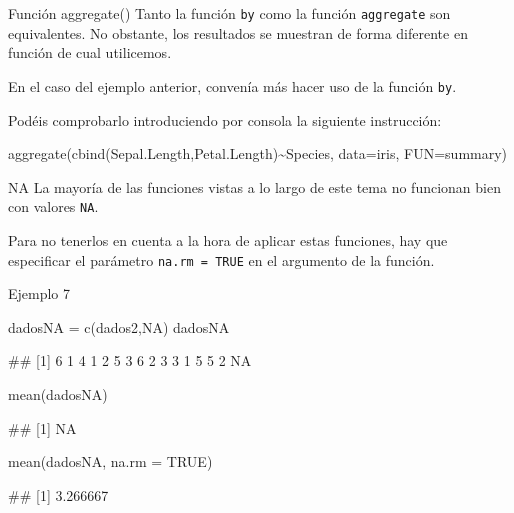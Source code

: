 \documentclass[
  ignorenonframetext,
  aspectratio=169]{beamer}
\newenvironment{Shaded}{\begin{snugshade}}{\end{snugshade}}
\newcommand{\AttributeTok}[1]{\textcolor[rgb]{0.77,0.63,0.00}{#1}}
\newcommand{\ConstantTok}[1]{\textcolor[rgb]{0.00,0.00,0.00}{#1}}
\newcommand{\FunctionTok}[1]{\textcolor[rgb]{0.00,0.00,0.00}{#1}}
\newcommand{\NormalTok}[1]{#1}
\newcommand{\OtherTok}[1]{\textcolor[rgb]{0.56,0.35,0.01}{#1}}
\newcommand{\SpecialCharTok}[1]{\textcolor[rgb]{0.00,0.00,0.00}{#1}}
\let\oldverbatim\verbatim
\let\endoldverbatim\endverbatim
\renewenvironment{verbatim}{\tiny\oldverbatim}{\endoldverbatim}
\begin{document}
\begin{frame}[fragile]{Función aggregate()}
\protect\hypertarget{funciuxf3n-aggregate}{}
Tanto la función \texttt{by} como la función \texttt{aggregate} son
equivalentes. No obstante, los resultados se muestran de forma diferente
en función de cual utilicemos.

En el caso del ejemplo anterior, convenía más hacer uso de la función
\texttt{by}.

Podéis comprobarlo introduciendo por consola la siguiente instrucción:

\begin{Shaded}
\begin{Highlighting}[]
\FunctionTok{aggregate}\NormalTok{(}\FunctionTok{cbind}\NormalTok{(Sepal.Length,Petal.Length)}\SpecialCharTok{\textasciitilde{}}\NormalTok{Species, }\AttributeTok{data=}\NormalTok{iris, }\AttributeTok{FUN=}\NormalTok{summary)}
\end{Highlighting}
\end{Shaded}
\end{frame}

\begin{frame}[fragile]{NA}
\protect\hypertarget{na}{}
La mayoría de las funciones vistas a lo largo de este tema no funcionan
bien con valores \texttt{NA}.

Para no tenerlos en cuenta a la hora de aplicar estas funciones, hay que
especificar el parámetro \texttt{na.rm\ =\ TRUE} en el argumento de la
función.
\end{frame}

\begin{frame}[fragile]{Ejemplo 7}
\protect\hypertarget{ejemplo-7}{}
\begin{Shaded}
\begin{Highlighting}[]
\NormalTok{dadosNA }\OtherTok{=} \FunctionTok{c}\NormalTok{(dados2,}\ConstantTok{NA}\NormalTok{)}
\NormalTok{dadosNA}
\end{Highlighting}
\end{Shaded}

\begin{verbatim}
##  [1]  6  1  4  1  2  5  3  6  2  3  3  1  5  5  2 NA
\end{verbatim}

\begin{Shaded}
\begin{Highlighting}[]
\FunctionTok{mean}\NormalTok{(dadosNA)}
\end{Highlighting}
\end{Shaded}

\begin{verbatim}
## [1] NA
\end{verbatim}

\begin{Shaded}
\begin{Highlighting}[]
\FunctionTok{mean}\NormalTok{(dadosNA, }\AttributeTok{na.rm =} \ConstantTok{TRUE}\NormalTok{)}
\end{Highlighting}
\end{Shaded}

\begin{verbatim}
## [1] 3.266667
\end{verbatim}
\end{frame}
\end{document}
